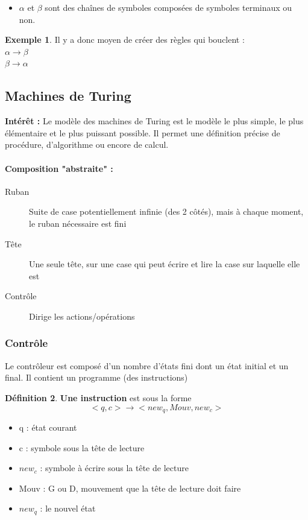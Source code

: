 \documentclass[11pt,a4paper]{article}
\theoremstyle{definition}
\newtheorem{mydef}{Définition}
\newtheorem{myexem}[mydef]{Exemple}
\begin{document}
\begin{itemize}
	\item $\alpha$ et $\beta$ sont des chaînes de symboles composées de 
		symboles terminaux ou non.
\end{itemize}

\begin{myexem}
	Il y a donc moyen de créer des règles qui bouclent : \\
	$\alpha \rightarrow \beta$ \\
	$\beta \rightarrow \alpha$\\
\end{myexem}

\subsection{Machines de Turing}

\textbf{Intérêt :} Le modèle des machines de Turing est le modèle le plus 
simple, le plus élémentaire et le plus puissant possible. Il permet une 
définition précise de procédure, d'algorithme ou encore de calcul.

\paragraph{Composition "abstraite" :}

\begin{description}
	\item[Ruban] Suite de case potentiellement infinie (des 2 côtés), mais à 
		chaque moment, le ruban nécessaire est fini
	\item[Tête] Une seule tête, sur une case qui peut écrire et lire la 
		case sur laquelle elle est
	\item[Contrôle] Dirige les actions/opérations
\end{description}

\subsubsection{Contrôle}
\label{ssub:contr_le}
Le contrôleur est composé d'un nombre d'états fini dont un état initial et un 
final. Il contient un programme (des instructions)

\begin{mydef}
	\textbf{Une instruction} est sous la forme 
	$$<q,c> \rightarrow <new_q, Mouv, new_c>$$
	\begin{itemize}
		\item q : état courant
		\item c : symbole sous la tête de lecture
		\item $new_c$ : symbole à écrire sous la tête de lecture
		\item Mouv : G ou D, mouvement que la tête de lecture doit faire
		\item $new_q$ : le nouvel état
	\end{itemize}
\end{mydef}
\end{document}
